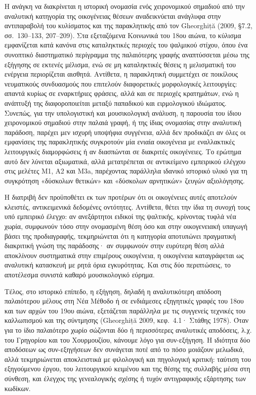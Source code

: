 \documentclass[11pt,a4paper]{article}
\begin{document}
Η ανάγκη να διακρίνεται η ιστορική ονομασία ενός χειρονομικού σημαδιού από την αναλυτική κατηγορία της οικογένειας θέσεων αναδεικνύεται ανάγλυφα στην αντιπαραβολή του κυλίσματος και της παρακλητικής από τον Gheorghiță (2009, §7.2, σσ.~130--133, 207--209). Στα εξεταζόμενα Κοινωνικά του 18ου αιώνα, το κύλισμα εμφανίζεται κατά κανόνα στις καταληκτικές περιοχές του ψαλμικού στίχου, όπου ένα συνοπτικό διαστηματικό περίγραμμα της παλαιότερης γραφής αναπτύσσεται μέσω της εξήγησης σε εκτενές μέλισμα, ενώ σε μη καταληκτικές θέσεις η μελισματική του ενέργεια περιορίζεται αισθητά. Αντίθετα, η παρακλητική συμμετέχει σε ποικίλους νευματικούς συνδυασμούς που επιτελούν διαφορετικές μορφολογικές λειτουργίες: απαντά κυρίως σε εναρκτήριες φράσεις, αλλά και σε περιοχές κρατημάτων, ενώ η ανάπτυξή της διαφοροποιείται μεταξύ παπαδικού και ειρμολογικού ιδιώματος. Συνεπώς, για την υπολογιστική και μουσικολογική ανάλυση, η παρουσία του ίδιου χειρονομικού σημαδιού στην παλαιά γραφή, ή της ίδιας ονομασίας στην αναλυτική παράδοση, παρέχει μεν ισχυρή υποψήφια συγγένεια, αλλά δεν προδικάζει αν όλες οι εμφανίσεις της παρακλητικής συγκροτούν μία ενιαία οικογένεια με εναλλακτικές λειτουργικές διαμορφώσεις ή αν διασπώνται σε διακριτές οικογένειες. Το ερώτημα αυτό δεν λύνεται αξιωματικά, αλλά μετατρέπεται σε αντικείμενο εμπειρικού ελέγχου στις μελέτες Μ1, Α2 και Μ3a, παρέχοντας παράλληλα ιδανικό ιστορικό υλικό για τη συγκρότηση «δύσκολων θετικών» και «δύσκολων αρνητικών» ζευγών αξιολόγησης.

Η διατριβή δεν προϋποθέτει εκ των προτέρων ότι οι οικογένειες αυτές αποτελούν κλειστές, αντικειμενικά δεδομένες οντότητες. Αντίθετα, θέτει την ίδια τη συνοχή τους υπό εμπειρικό έλεγχο: αν ανεξάρτητοι ειδικοί της ψαλτικής, κρίνοντας τυφλά νέα χωρία, συμφωνούν τόσο στην ονομασμένη θέση όσο και στην οικογενειακή υπαγωγή βάσει της προδιαγραφής, τεκμηριώνεται ότι η κατηγορία αποτυπώνει πραγματική διακριτική γνώση της παράδοσης· αν συμφωνούν στην ευρύτερη θέση αλλά αποκλίνουν συστηματικά στην επιμέρους οικογένεια, η οικογένεια καταγράφεται ως αναλυτική κατασκευή με ρητά όρια εγκυρότητας. Και στις δύο περιπτώσεις, το αποτέλεσμα συνιστά καθαρό μουσικολογικό εύρημα.

Τέλος, στο ιστορικό επίπεδο, η εξήγηση, δηλαδή η αναλυτικότερη απόδοση παλαιότερου μέλους στη Νέα Μέθοδο ή σε ενδιάμεσες εξηγητικές γραφές του 18ου και των αρχών του 19ου αιώνα, εξετάζεται παράλληλα με τις συγγενείς τεχνικές του καλλωπισμού και της σύντμησης (Gheorghiță 2009, κεφ.~4.1· Στάθης 1978). Όταν για το ίδιο παλαιότερο χωρίο σώζονται δύο ή περισσότερες αναλυτικές αποδόσεις, λ.χ. του Γρηγορίου και του Χουρμουζίου, κάνουμε λόγο για συν-εξήγηση. Η ιδιότητα δύο αποδόσεων ως συν-εξηγήσεων δεν συνάγεται ποτέ από το πόσο μοιάζουν μελωδικά, αλλά τεκμηριώνεται αποκλειστικά με φιλολογική και πηγολογική κριτική: ταύτιση του εξηγούμενου έργου, του λειτουργικού κειμένου και της θέσης της συλλαβής μέσα στη σύνθεση, και έλεγχος της γενεαλογικής σχέσης ή τυχόν αντιγραφικής εξάρτησης των κωδίκων.
\end{document}
